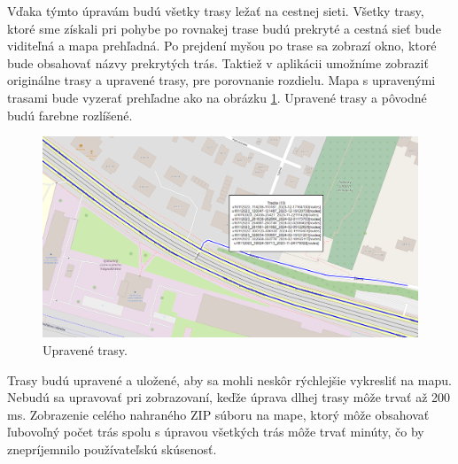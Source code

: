 Vďaka týmto úpravám budú všetky trasy ležať na cestnej sieti. Všetky trasy, ktoré sme získali pri pohybe po rovnakej trase budú prekryté a cestná sieť bude viditeľná a mapa prehľadná. Po prejdení myšou po trase sa zobrazí okno, ktoré bude obsahovať názvy prekrytých trás. Taktiež v aplikácii umožníme zobraziť originálne trasy a upravené trasy, pre porovnanie rozdielu. Mapa s upravenými trasami bude vyzerať prehľadne ako na obrázku \ref{fig:prehladne-trasy}. Upravené trasy a pôvodné budú farebne rozlíšené.

\begin{figure}[H]
  \centering
  \includegraphics[width=1 \textwidth]{img/problematika_gps/prehladne_trasy.png}
  \caption{Upravené trasy.}
  \label{fig:prehladne-trasy}
\end{figure}

Trasy budú upravené a uložené, aby sa mohli neskôr rýchlejšie vykresliť na mapu. Nebudú sa upravovať pri zobrazovaní, keďže úprava dlhej trasy môže trvať až 200 ms. Zobrazenie celého nahraného ZIP súboru na mape, ktorý môže obsahovať ľubovoľný počet trás spolu s úpravou všetkých trás môže trvať minúty, čo by znepríjemnilo používateľskú skúsenosť.